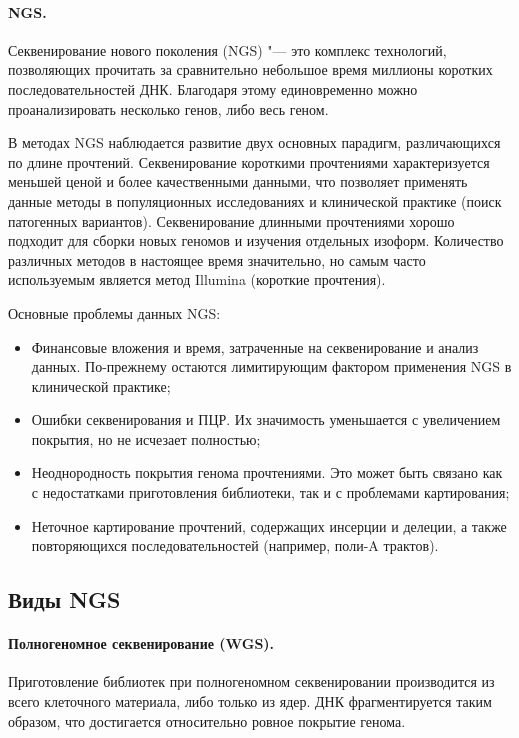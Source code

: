 \documentclass[a4paper,12pt]{article}
\begin{document}
\paragraph{NGS.}
Секвенирование нового поколения (NGS) "--- это комплекс технологий, позволяющих прочитать за сравнительно небольшое время миллионы коротких последовательностей ДНК.
Благодаря этому единовременно можно проанализировать несколько генов, либо весь геном.

В методах NGS наблюдается развитие двух основных парадигм, различающихся по длине прочтений.
Секвенирование короткими прочтениями характеризуется меньшей ценой и более качественными данными, что позволяет применять данные методы в популяционных исследованиях и клинической практике (поиск патогенных вариантов).
Секвенирование длинными прочтениями хорошо подходит для сборки новых геномов и изучения отдельных изоформ\cite{goodwin}.
Количество различных методов в настоящее время значительно, но самым часто используемым является метод Illumina (короткие прочтения).

Основные проблемы данных NGS:

\begin{itemize}
\item Финансовые вложения и время, затраченные на секвенирование и анализ данных.
По-прежнему остаются лимитирующим фактором применения NGS в клинической практике;
\item Ошибки секвенирования и ПЦР.
Их значимость уменьшается с увеличением покрытия, но не исчезает полностью;
\item Неоднородность покрытия генома прочтениями.
Это может быть связано как с недостатками приготовления библиотеки, так и с проблемами картирования;
\item Неточное картирование прочтений, содержащих инсерции и делеции, а также повторяющихся последовательностей (например, поли-A трактов).
\end{itemize}

\subsection{Виды NGS}

\paragraph{Полногеномное секвенирование (WGS).}
Приготовление библиотек при полногеномном секвенировании производится из всего клеточного материала, либо только из ядер.
ДНК фрагментируется таким образом, что достигается относительно ровное покрытие генома.
\end{document}
